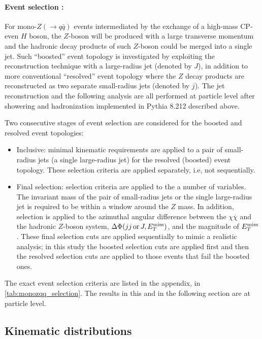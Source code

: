  
\paragraph{Event selection :} 
For mono-$Z (\to q\bar{q})$ events intermediated by the exchange of a high-mass CP-even $H$ boson, 
the $Z$-boson will be produced with 
a large transverse momentum and the hadronic decay products of such $Z$-boson could be merged into a single jet. 
Such ``boosted'' event topology is investigated by exploiting the reconstruction technique with 
a large-radius jet (denoted by $J$), 
in addition to more conventional ``resolved'' event topology where the $Z$ decay products are reconstructed 
as two separate
small-radius jets (denoted by $j$). The jet reconstruction and the following analysis are all performed at particle level
after showering and hadronization implemented in Pythia 8.212 described above.

Two consecutive stages of event selection are considered for the boosted and resolved event topologies:
\begin{itemize}
\item Inclusive: minimal kinematic requirements are applied to a pair of small-radius jets (a single large-radius jet) 
for the resolved (boosted) event topology. 
These selection criteria are applied separately, i.e, not sequentially.
\item Final selection: selection criteria are applied to the a number of variables. 
The invariant mass of the pair of small-radius jets or the single large-radius jet is required to be within a window around the $Z$ mass. 
In addition, selection is applied to the azimuthal angular difference between the $\chi\overline{\chi}$ and the hadronic $Z$-boson system, $\Delta\Phi(jj {\,\text{or}\,} J, E_T^\mathrm{miss})$, and the magnitude of $E_T^\mathrm{miss}$.
These final selection cuts are applied sequentially to mimic a realistic analysis; in this study the boosted selection cuts are applied first and then the resolved selection cuts are applied to those events that fail the boosted ones.
\end{itemize}

The exact event selection criteria are listed in the appendix, in \autoref{tab:monozqq_selection}. The results in this and in the following section are at particle level. 

\subsection{Kinematic distributions}

